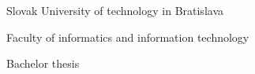 \begin{center}
\thispagestyle{empty}
{\Large Slovak University of technology in Bratislava}
\par\end{center}{\Large \par}

\begin{center}
{\Large Faculty of informatics and information technology}
\par\end{center}{\Large \par}

\smallskip{}

\begin{center}
\par\end{center}
\vfill{}

\begin{center}
\textbf{\Large \myName}
\par\end{center}{\Large \par}

\medskip{}


\begin{center}
\textbf{\LARGE \myTitleENG }
\par\end{center}{\huge \par}

\medskip{}


\begin{center}

{\Large Bachelor thesis}
\par\end{center}{\Large \par}

\vfill{}
